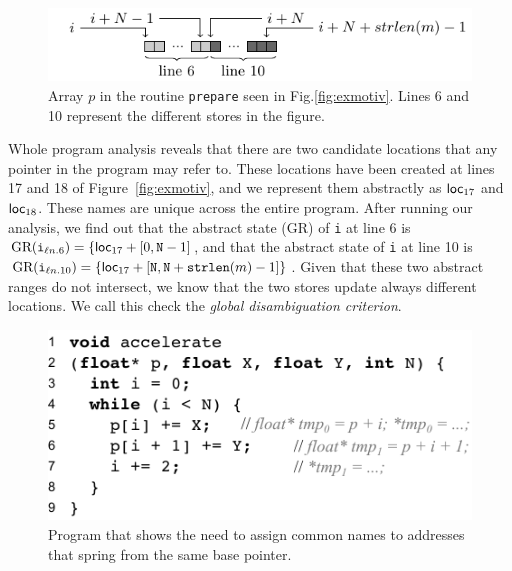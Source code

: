 \documentclass[12pt]{article}
\newcommand\loc[1]{\mbox{\textsf{loc}$_{#1}$}}
\newcommand\gr{\xspace\mbox{GR}\xspace}
\begin{document}
\begin{figure}[t!]
\begin{small}
  \centering
\includegraphics{img/pointer_range_Maroua}
  \caption{Array $p$ in the routine \texttt{prepare} seen in
    Fig.\ref{fig:exmotiv}. Lines 6 and 10 represent the different stores in the figure.}
  \label{fig:pointer_range}
\end{small}
\end{figure}

Whole program analysis reveals that there are two candidate locations
that any pointer in the program may refer to.
These locations have been created at lines 17 and 18 of Figure~\ref{fig:exmotiv},
and we represent them abstractly as $\loc{17}$ and  $\loc{18}$.
These names are unique across the entire program.
After running our analysis, we find out that the abstract state ($\gr$) of
\texttt{i} at line 6 is
$\gr(\mathtt{i}_{\ell{}n.6}) = \{ \loc{17} + [0, \mathtt{N} - 1]$,
and that the abstract state of \texttt{i} at line 10 is
$\gr(\mathtt{i}_{\ell{}n.10}) = \{ \loc{17} + [\mathtt{N}, \mathtt{N + strlen}(m) - 1]
\}$.
Given that these two abstract ranges do not intersect, we know that
the two stores update always different locations.
We call this check the {\em global disambiguation
  criterion}.

\begin{figure}[t!]
  \centering
\includegraphics{img/ex4_src}
  \caption{Program that shows the need to assign common names to addresses that spring from the same base pointer.}
  \label{fig:ex4_src}
\end{figure}
\end{document}
